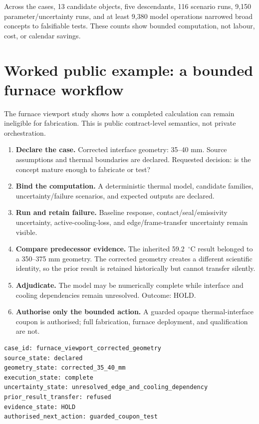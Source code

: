 \documentclass[9pt,a4paper]{article}
\begin{document}
Across the cases, 13 candidate objects, five descendants, 116 scenario runs, 9,150 parameter/uncertainty runs, and at least 9,380 model operations narrowed broad concepts to falsifiable tests. These counts show bounded computation, not labour, cost, or calendar savings.

\section{Worked public example: a bounded furnace workflow}
The furnace viewport study shows how a completed calculation can remain ineligible for fabrication. This is public contract-level semantics, not private orchestration.

\begin{enumerate}[leftmargin=*]
\item \textbf{Declare the case.} Corrected interface geometry: 35--40 mm. Source assumptions and thermal boundaries are declared. Requested decision: is the concept mature enough to fabricate or test?
\item \textbf{Bind the computation.} A deterministic thermal model, candidate families, uncertainty/failure scenarios, and expected outputs are declared.
\item \textbf{Run and retain failure.} Baseline response, contact/seal/emissivity uncertainty, active-cooling-loss, and edge/frame-transfer uncertainty remain visible.
\item \textbf{Compare predecessor evidence.} The inherited 59.2~$^\circ$C result belonged to a 350--375 mm geometry. The corrected geometry creates a different scientific identity, so the prior result is retained historically but cannot transfer silently.
\item \textbf{Adjudicate.} The model may be numerically complete while interface and cooling dependencies remain unresolved. Outcome: HOLD.
\item \textbf{Authorise only the bounded action.} A guarded opaque thermal-interface coupon is authorised; full fabrication, furnace deployment, and qualification are not.
\end{enumerate}

\begin{verbatim}
case_id: furnace_viewport_corrected_geometry
source_state: declared
geometry_state: corrected_35_40_mm
execution_state: complete
uncertainty_state: unresolved_edge_and_cooling_dependency
prior_result_transfer: refused
evidence_state: HOLD
authorised_next_action: guarded_coupon_test
\end{verbatim}
\end{document}
